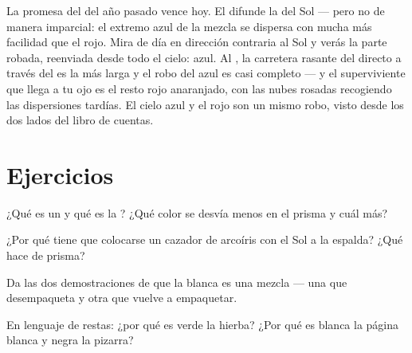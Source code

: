 \begin{remark}\label{rem:g8:colors-spectra:sunset}
La promesa del  del año pasado vence hoy. El
 difunde la  del Sol --- pero no de manera imparcial: el
extremo azul de la mezcla se dispersa con mucha más facilidad que el
rojo. Mira de día en dirección contraria al Sol y verás la parte
robada, reenviada desde todo el cielo: azul. Al , la
carretera rasante del  directo a través del  es la
más larga y el robo del azul es casi completo --- y el superviviente
que llega a tu ojo es el resto rojo anaranjado, con las nubes rosadas
recogiendo las dispersiones tardías. El cielo azul y el
 rojo son un mismo robo, visto desde los dos lados del
libro de cuentas.
\end{remark}

\section{Ejercicios}

\begin{exercise}[$\star$]\label{exo:g8:colors-spectra:1}
¿Qué es un  y qué es la ? ¿Qué color
se desvía menos en el prisma y cuál más?
\end{exercise}

\begin{exercise}[$\star$]\label{exo:g8:colors-spectra:2}
¿Por qué tiene que colocarse un cazador de arcoíris con el Sol a la
espalda? ¿Qué hace de prisma?
\end{exercise}

\begin{exercise}[$\star$]\label{exo:g8:colors-spectra:3}
Da las dos demostraciones de que la  blanca es una mezcla --- una
que desempaqueta y otra que vuelve a empaquetar.
\end{exercise}

\begin{exercise}[$\star$]\label{exo:g8:colors-spectra:4}
En lenguaje de restas: ¿por qué es verde la hierba? ¿Por qué es blanca
la página blanca y negra la pizarra?
\end{exercise}

